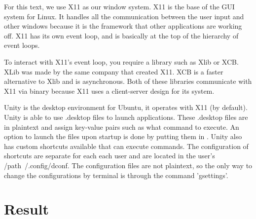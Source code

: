 \documentclass[12pt]{article}
\begin{document}
For this text, we use X11 as our window system.
X11 is the base of the GUI system for Linux.
It handles all the communication between the user input and other windows because it is the framework that other applications are working off.
X11 has its own event loop, and is basically at the top of the hierarchy of event loops.

To interact with X11's event loop, you require a library such as Xlib or XCB.
XLib was made by the same company that created X11.
XCB is a faster alternative to Xlib and is asynchronous.
Both of these libraries communicate with X11 via binary because X11 uses a client-server design for its system.

Unity is the desktop environment for Ubuntu, it operates with X11 (by default). Unity is able to use .desktop files to launch applications.
These .desktop files are in plaintext and assign key-value pairs such as what command to execute.
An option to launch the files upon startup is done by putting them in .
Unity also has custom shortcuts available that can execute commands.
The configuration of shortcuts are separate for each each user and are located in the user's /path{~/.config/dconf}.
The configuration files are not plaintext, so the only way to change the configurations by terminal is through the command 'gsettings'.


	
\section{Result}
\end{document}
